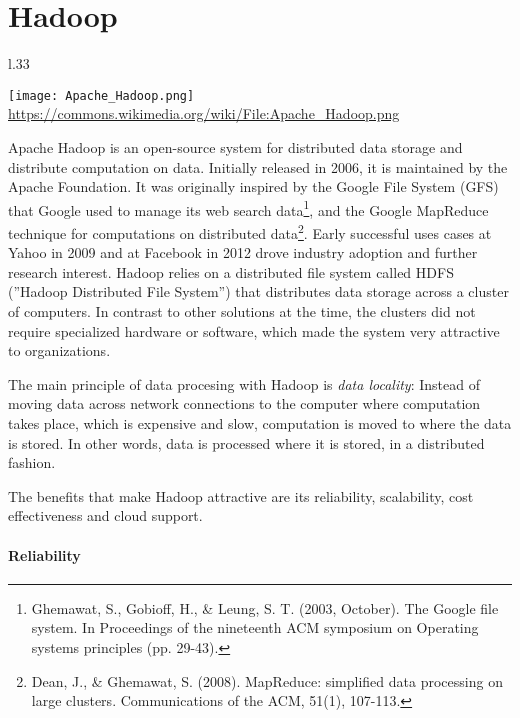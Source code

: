 \FloatBarrier

\section{Hadoop}

\begin{wrapfigure}{l}{.33\textwidth}
\begin{center}
\texttt{[image: Apache\_Hadoop.png]}
\scriptsize \url{https://commons.wikimedia.org/wiki/File:Apache_Hadoop.png}
\end{center}
\end{wrapfigure}

Apache Hadoop is an open-source system for distributed data storage and distribute computation on data. Initially released in 2006, it is maintained by the Apache Foundation. It was originally inspired by the Google File System (GFS) that Google used to manage its web search data\footnote{Ghemawat, S., Gobioff, H., \& Leung, S. T. (2003, October). The Google file system. In Proceedings of the nineteenth ACM symposium on Operating systems principles (pp. 29-43).}, and the Google MapReduce technique for computations on distributed data\footnote{Dean, J., \& Ghemawat, S. (2008). MapReduce: simplified data processing on large clusters. Communications of the ACM, 51(1), 107-113.}. Early successful uses cases at Yahoo in 2009 and at Facebook in 2012 drove industry adoption and further research interest. Hadoop relies on a distributed file system called HDFS (''Hadoop Distributed File System'') that distributes data storage across a cluster of computers. In contrast to other solutions at the time, the clusters did not require specialized hardware or software, which made the system very attractive to organizations. 

The main principle of data procesing with Hadoop is \emph{data locality}: Instead of moving data across network connections to the computer where computation takes place, which is expensive and slow, computation is moved to where the data is stored. In other words, data is processed where it is stored, in a distributed fashion.

The benefits that make Hadoop attractive are its reliability, scalability, cost effectiveness and cloud support. 

\paragraph*{Reliability}

